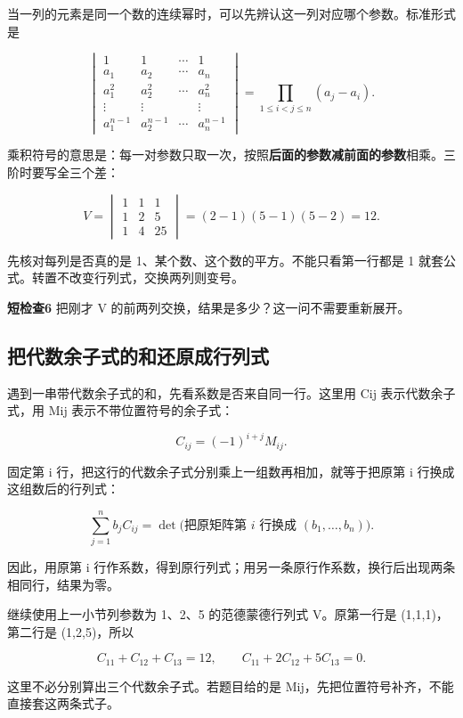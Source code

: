 \documentclass[
  11pt,
  a4paper,
  fontset=fandol]{ctexart}
\begin{document}
当一列的元素是同一个数的连续幂时，可以先辨认这一列对应哪个参数。标准形式是

\[\begin{vmatrix}
1&1&\cdots&1\\
a_1&a_2&\cdots&a_n\\
a_1^2&a_2^2&\cdots&a_n^2\\
\vdots&\vdots&&\vdots\\
a_1^{n-1}&a_2^{n-1}&\cdots&a_n^{n-1}
\end{vmatrix}
=\prod_{1\le i<j\le n}(a_j-a_i).\]

乘积符号的意思是：每一对参数只取一次，按照\textbf{后面的参数减前面的参数}相乘。三阶时要写全三个差：

\[V=\begin{vmatrix}1&1&1\\1&2&5\\1&4&25\end{vmatrix}
=(2-1)(5-1)(5-2)=12.\]

先核对每列是否真的是 1、某个数、这个数的平方。不能只看第一行都是 1
就套公式。转置不改变行列式，交换两列则变号。

\textbf{短检查6} 把刚才 V
的前两列交换，结果是多少？这一问不需要重新展开。


\subsection{把代数余子式的和还原成行列式}\label{ux628aux4ee3ux6570ux4f59ux5b50ux5f0fux7684ux548cux8fd8ux539fux6210ux884cux5217ux5f0f}

遇到一串带代数余子式的和，先看系数是否来自同一行。这里用 Cij
表示代数余子式，用 Mij 表示不带位置符号的余子式：

\[C_{ij}=(-1)^{i+j}M_{ij}.\]

固定第 i 行，把这行的代数余子式分别乘上一组数再相加，就等于把原第 i
行换成这组数后的行列式：

\[\sum_{j=1}^{n}b_jC_{ij}
=\det\bigl(\text{把原矩阵第 }i\text{ 行换成 }(b_1,\ldots,b_n)\bigr).\]

因此，用原第 i
行作系数，得到原行列式；用另一条原行作系数，换行后出现两条相同行，结果为零。

继续使用上一小节列参数为 1、2、5 的范德蒙德行列式 V。原第一行是
(1,1,1)，第二行是 (1,2,5)，所以

\[C_{11}+C_{12}+C_{13}=12,
\qquad C_{11}+2C_{12}+5C_{13}=0.\]

这里不必分别算出三个代数余子式。若题目给的是
Mij，先把位置符号补齐，不能直接套这两条式子。
\end{document}
